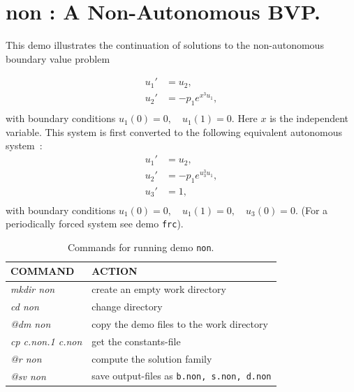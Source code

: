 \documentclass[12pt]{report}
\begin{document}
\newpage
\section{ non : A Non-Autonomous BVP.} \label{sec:Demos_non}
This demo illustrates the continuation of solutions to
the non-autonomous boundary value problem

\begin{equation} \begin{array}{cl}
  u_1 ' &= u_2  ,  \\
  u_2 ' &= -p_1  e^{x^3 u_1} , \\\end{array} \end{equation}
with boundary conditions $ u_1(0)=0 ,  \quad  u_1(1)=0.$
Here $x$ is the independent variable.
This system is first converted to the following equivalent
autonomous system~:
\begin{equation} \begin{array}{cl}
  u_1 ' &= u_2  ,  \\
  u_2 ' &= -p_1  e^{u_3^3 u_1} ,  \\  
  u_3 ' &= 1 ,  \\
\end{array} \end{equation}
 with boundary conditions $ u_1(0)=0 ,  \quad  u_1(1)=0, \quad u_3(0)=0.$
(For a periodically forced system see demo {\tt frc}).

\begin{table}[htbp]
\begin{center}
\begin{tabular}{| l | l |}
\hline
  COMMAND  & ACTION \\
\hline
  {\it mkdir non} & create an empty work directory \\ 
  {\it cd non} & change directory \\
  {\it @dm non} & copy the demo files to the work directory \\
\hline

  {\it cp c.non.1 c.non} & get the constants-file \\ 
  {\it @r non} & compute the solution family \\ 
  {\it @sv non} & save output-files as {\tt b.non, s.non, d.non} \\ 
\hline
\end{tabular}
\caption{Commands for running demo {\tt non}.}
\label{tbl:demo_non}
\end{center}
\end{table}
\end{document}
